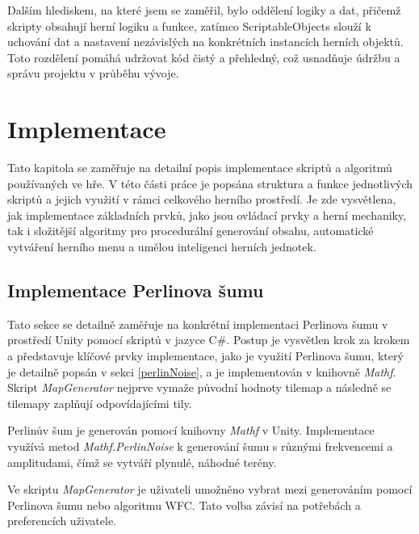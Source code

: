 Dalším hlediskem, na které jsem se zaměřil, bylo oddělení logiky a dat, přičemž skripty obsahují herní logiku a funkce, zatímco ScriptableObjects slouží k uchování dat a nastavení nezávislých na konkrétních instancích herních objektů. Toto rozdělení pomáhá udržovat kód čistý a přehledný, což usnadňuje údržbu a správu projektu v průběhu vývoje.

\chapter{Implementace}
\label{implementace}
Tato kapitola se zaměřuje na detailní popis implementace skriptů a algoritmů používaných ve hře. V této části práce je popsána struktura a funkce jednotlivých skriptů a jejich využití v rámci celkového herního prostředí. Je zde vysvětlena, jak implementace základních prvků, jako jsou ovládací prvky a herní mechaniky, tak i složitější algoritmy pro procedurální generování obsahu, automatické vytváření herního menu a umělou inteligenci herních jednotek.

\section{Implementace Perlinova šumu}

Tato sekce se detailně zaměřuje na konkrétní implementaci Perlinova šumu v prostředí Unity pomocí skriptů v jazyce C\#. Postup je vysvětlen krok za krokem a představuje klíčové prvky implementace, jako je využití Perlinova šumu, který je detailně popsán v sekci \ref{perlinNoise}, a je implementován v knihovně \textit{Mathf}. Skript \textit{MapGenerator} nejprve vymaže původní hodnoty tilemap a následně se tilemapy zaplňují odpovídajícími tily.

Perlinův šum je generován pomocí knihovny \textit{Mathf} v Unity. Implementace využívá metod \textit{Mathf.PerlinNoise} k generování šumu s různými frekvencemi a amplitudami, čímž se vytváří plynulé, náhodné terény.

Ve skriptu \textit{MapGenerator} je uživateli umožněno vybrat mezi generováním pomocí Perlinova šumu nebo algoritmu WFC. Tato volba závisí na potřebách a preferencích uživatele.

